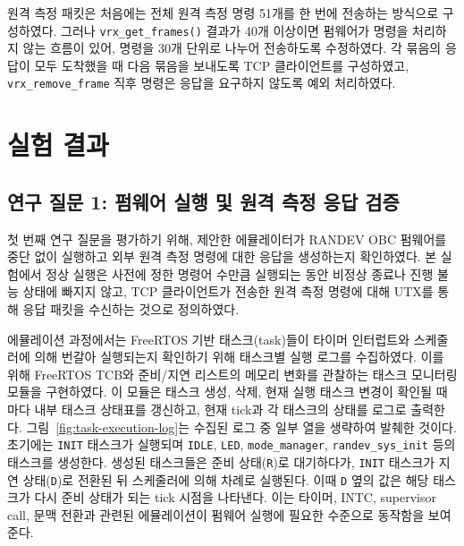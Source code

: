 \documentclass[master,korean,final]{kaist-ucs}
\begin{document}
원격 측정 패킷은 처음에는 전체 원격 측정 명령 51개를 한 번에 전송하는 방식으로 구성하였다. 그러나 \texttt{vrx\_get\_frames()} 결과가 40개 이상이면 펌웨어가 명령을 처리하지 않는 흐름이 있어, 명령을 30개 단위로 나누어 전송하도록 수정하였다. 각 묶음의 응답이 모두 도착했을 때 다음 묶음을 보내도록 TCP 클라이언트를 구성하였고, \texttt{vrx\_remove\_frame} 직후 명령은 응답을 요구하지 않도록 예외 처리하였다.

\section{실험 결과}

\subsection{연구 질문 1: 펌웨어 실행 및 원격 측정 응답 검증}

첫 번째 연구 질문을 평가하기 위해, 제안한 에뮬레이터가 RANDEV OBC 펌웨어를 중단 없이 실행하고 외부 원격 측정 명령에 대한 응답을 생성하는지 확인하였다. 본 실험에서 정상 실행은 사전에 정한 명령어 수만큼 실행되는 동안 비정상 종료나 진행 불능 상태에 빠지지 않고, TCP 클라이언트가 전송한 원격 측정 명령에 대해 UTX를 통해 응답 패킷을 수신하는 것으로 정의하였다.

에뮬레이션 과정에서는 FreeRTOS 기반 태스크(task)들이 타이머 인터럽트와 스케줄러에 의해 번갈아 실행되는지 확인하기 위해 태스크별 실행 로그를 수집하였다. 이를 위해 FreeRTOS TCB와 준비/지연 리스트의 메모리 변화를 관찰하는 태스크 모니터링 모듈을 구현하였다. 이 모듈은 태스크 생성, 삭제, 현재 실행 태스크 변경이 확인될 때마다 내부 태스크 상태표를 갱신하고, 현재 tick과 각 태스크의 상태를 로그로 출력한다. 그림~\ref{fig:task-execution-log}는 수집된 로그 중 일부 열을 생략하여 발췌한 것이다. 초기에는 \texttt{INIT} 태스크가 실행되며 \texttt{IDLE}, \texttt{LED}, \texttt{mode\_manager}, \texttt{randev\_sys\_init} 등의 태스크를 생성한다. 생성된 태스크들은 준비 상태(\texttt{R})로 대기하다가, \texttt{INIT} 태스크가 지연 상태(\texttt{D})로 전환된 뒤 스케줄러에 의해 차례로 실행된다. 이때 \texttt{D} 옆의 값은 해당 태스크가 다시 준비 상태가 되는 tick 시점을 나타낸다. 이는 타이머, INTC, supervisor call, 문맥 전환과 관련된 에뮬레이션이 펌웨어 실행에 필요한 수준으로 동작함을 보여준다.
\end{document}
